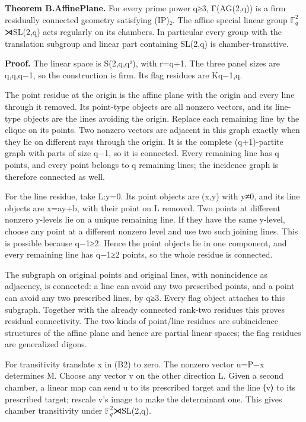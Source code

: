 \textbf{Theorem B.AffinePlane.} For every prime power q≥3, Γ(AG(2,q)) is
a firm residually connected geometry satisfying (IP)₂. The affine
special linear group \(\mathbb F_q^2\)⋊SL(2,q) acts regularly on its chambers. In
particular every group with the translation subgroup and linear part
containing SL(2,q) is chamber-transitive.

\textbf{Proof.} The linear space is S(2,q,q²), with r=q+1. The three
panel sizes are q,q,q−1, so the construction is firm. Its flag residues
are Kq−1,q.

The point residue at the origin is the affine plane with the origin and
every line through it removed. Its point-type objects are all nonzero
vectors, and its line-type objects are the lines avoiding the origin.
Replace each remaining line by the clique on its points. Two nonzero
vectors are adjacent in this graph exactly when they lie on different
rays through the origin. It is the complete (q+1)-partite graph with
parts of size q−1, so it is connected. Every remaining line has q
points, and every point belongs to q remaining lines; the incidence
graph is therefore connected as well.

For the line residue, take L:y=0. Its point objects are (x,y) with y≠0,
and its line objects are x=ay+b, with their point on L removed. Two
points at different nonzero y-levels lie on a unique remaining line. If
they have the same y-level, choose any point at a different nonzero
level and use two such joining lines. This is possible because q−1≥2.
Hence the point objects lie in one component, and every remaining line
has q−1≥2 points, so the whole residue is connected.

The subgraph on original points and original lines, with nonincidence as
adjacency, is connected: a line can avoid any two prescribed points, and
a point can avoid any two prescribed lines, by q≥3. Every flag object
attaches to this subgraph. Together with the already connected rank-two
residues this proves residual connectivity. The two kinds of point/line
residues are subincidence structures of the affine plane and hence are
partial linear spaces; the flag residues are generalized digons.

For transitivity translate x in (B2) to zero. The nonzero vector u=P−x
determines M. Choose any vector v on the other direction L. Given a
second chamber, a linear map can send u to its prescribed target and the
line ⟨v⟩ to its prescribed target; rescale v's image to make the
determinant one. This gives chamber transitivity under \(\mathbb F_q^2\)⋊SL(2,q).

